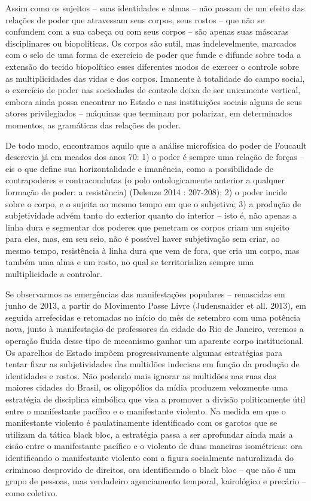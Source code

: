 Assim como os sujeitos -- suas identidades e almas -- não passam de um
efeito das relações de poder que atravessam seus corpos, seus rostos --
que não se confundem com a sua cabeça ou com seus corpos -- são apenas
suas máscaras disciplinares ou biopolíticas. Os corpos são sutil, mas
indelevelmente, marcados com o selo de uma forma de exercício de poder
que funde e difunde sobre toda a extensão do tecido biopolítico esses
diferentes modos de exercer o controle sobre as multiplicidades das
vidas e dos corpos. Imanente à totalidade do campo social, o exercício
de poder nas sociedades de controle deixa de ser unicamente vertical,
embora ainda possa encontrar no Estado e nas instituições sociais alguns
de seus atores privilegiados -- máquinas que terminam por polarizar, em
determinados momentos, as gramáticas das relações de poder.

De todo modo, encontramos aquilo que a análise microfísica do poder de
Foucault descrevia já em meados dos anos 70: 1) o poder é sempre uma
relação de forças -- eis o que define sua horizontalidade e imanência,
como a possibilidade de contrapoderes e contracondutas (o polo
ontologicamente anterior a qualquer formação de poder: a resistência)
(Deleuze 2014 : 207-208); 2) o poder incide sobre o corpo, e o sujeita
ao mesmo tempo em que o subjetiva; 3) a produção de subjetividade advém
tanto do exterior quanto do interior -- isto é, não apenas a linha dura
e segmentar dos poderes que penetram os corpos criam um sujeito para
eles, mas, em seu seio, não é possível haver subjetivação sem criar, ao
mesmo tempo, resistência à linha dura que vem de fora, que cria um
corpo, mas também uma alma e um rosto, no qual se territorializa sempre
uma multiplicidade a controlar.

Se observarmos as emergências das manifestações populares -- renascidas
em junho de 2013, a partir do Movimento Passe Livre (Judensnaider et
all. 2013), em seguida arrefecidas e retomadas no início do mês de
setembro com uma potência nova, junto à manifestação de professores da
cidade do Rio de Janeiro, veremos a operação fluida desse tipo de
mecanismo ganhar um aparente corpo institucional. Os aparelhos de Estado
impõem progressivamente algumas estratégias para tentar fixar as
subjetividades das multidões indecisas em função da produção de
identidades e rostos. Não podendo mais ignorar as multidões nas ruas das
maiores cidades do Brasil, os oligopólios da mídia produzem velozmente
uma estratégia de disciplina simbólica que visa a promover a divisão
politicamente útil entre o manifestante pacífico e o manifestante
violento. Na medida em que o manifestante violento é paulatinamente
identificado com os garotos que se utilizam da tática black bloc, a
estratégia passa a ser aprofundar ainda mais a cisão entre o
manifestante pacífico e o violento de duas maneiras isométricas: ora
identificando o manifestante violento com a figura socialmente
naturalizada do criminoso desprovido de direitos, ora identificando o
black bloc -- que não é um grupo de pessoas, mas verdadeiro agenciamento
temporal, kairológico e precário -- como coletivo.

